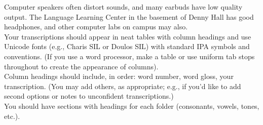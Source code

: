 \documentclass[12pt]{article}
\begin{document}
Computer speakers often distort sounds, and many earbuds have low quality output.  The Language Learning Center in the basement of Denny Hall has good headphones, and other computer labs on campus may also.\\
Your transcriptions should appear in neat tables with column headings and use Unicode fonts (e.g., Charis SIL or Doulos SIL) with standard IPA symbols and conventions.  (If you use a word processor, make a table or use uniform tab stops throughout to create the appearance of columns).\\
Column headings should include, in order: word number, word gloss, your transcription.  (You may add others, as appropriate; e.g., if you’d like to add second options or notes to unconfident transcriptions.)\\
You should have sections with headings for each folder (consonants, vowels, tones, etc.).\\
\end{document}
